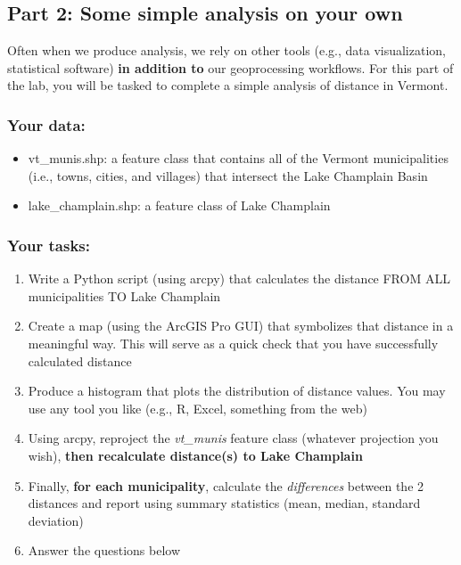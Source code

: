 \documentclass[
]{article}
\providecommand{\tightlist}{%
  \setlength{\itemsep}{0pt}\setlength{\parskip}{0pt}}
\begin{document}
\newpage

\hypertarget{part-2-some-simple-analysis-on-your-own}{%
\subsection{Part 2: Some simple analysis on your
own}\label{part-2-some-simple-analysis-on-your-own}}

Often when we produce analysis, we rely on other tools (e.g., data
visualization, statistical software) \textbf{in addition to} our
geoprocessing workflows. For this part of the lab, you will be tasked to
complete a simple analysis of distance in Vermont.

\hypertarget{your-data}{%
\subsubsection{Your data:}\label{your-data}}

\begin{itemize}
\item
  vt\_munis.shp: a feature class that contains all of the Vermont
  municipalities (i.e., towns, cities, and villages) that intersect the
  Lake Champlain Basin
\item
  lake\_champlain.shp: a feature class of Lake Champlain
\end{itemize}

\hypertarget{your-tasks}{%
\subsubsection{Your tasks:}\label{your-tasks}}

\begin{enumerate}
\def\labelenumi{\arabic{enumi}.}
\tightlist
\item
  Write a Python script (using arcpy) that calculates the distance FROM
  ALL municipalities TO Lake Champlain
\item
  Create a map (using the ArcGIS Pro GUI) that symbolizes that distance
  in a meaningful way. This will serve as a quick check that you have
  successfully calculated distance
\item
  Produce a histogram that plots the distribution of distance values.
  You may use any tool you like (e.g., R, Excel, something from the web)
\item
  Using arcpy, reproject the \emph{vt\_munis} feature class (whatever
  projection you wish), \textbf{then recalculate distance(s) to Lake
  Champlain}
\item
  Finally, \textbf{for each municipality}, calculate the
  \emph{differences} between the 2 distances and report using summary
  statistics (mean, median, standard deviation)
\item
  Answer the questions below
\end{enumerate}
\end{document}
